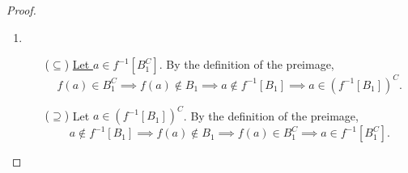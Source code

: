 \documentclass[11pt,openany]{article}
\begin{document}
\begin{proof}
{\begin{enumerate}[(1)]
\begin{itemize}
\begin{enumerate}[(i)]
			\item $f(a)\in B_1\implies a\in f^{-1}[B_1]$.
			\item $f(a)\in B_2\implies a\in f^{-1}[B_2]$.
		\end{enumerate}\ \\ \underline{Thus, $a\in f^{-1}[B_1]\cap f[B_2]$}.
		\vspace{12pt}
		\item[($\supseteq$)] \underline{Let $a\in f^{-1}[B_1]\cap f^{-1}[B_2]$}. Then $a\in f^{-1}[B_1]$ and $a\in f^{-1}[B_2]$. Then \textit{both} of the following hold:\\ \begin{enumerate}[(i)]
			\item $a\in f^{-1}[B_1]\implies f(a)\in B_1$.
			\item $a\in f^{-1}[B_2]\implies f(a)\in B_2$.
		\end{enumerate} \ \\
		That is, $f(a)\in B_1\cap B_2$. \underline{Thus, $a\in f^{-1}[B_1\cap B_2]$}.
	\end{itemize}
	\vspace{12pt}
	\item \begin{itemize}
		\item[($\subseteq$)] 
		\underline{Let $a\in f^{-1}[B_1^C]$}. By the definition of the preimage, \[
		f(a)\in B_1^C\implies f(a)\notin B_1\implies a\notin f^{-1}[B_1]\implies a\in(f^{-1}[B_1])^C.
		\]
		\item[($\supseteq$)] Let $a\in(f^{-1}[B_1])^C$. By the definition of the preimage, \[
		a\notin f^{-1}[B_1]\implies f(a)\notin B_1\implies f(a)\in B_1^C\implies a\in f^{-1}[B_1^C].
		\]
	\end{itemize}
\end{enumerate}}
\end{proof}
\vfill
{}
\end{document}
